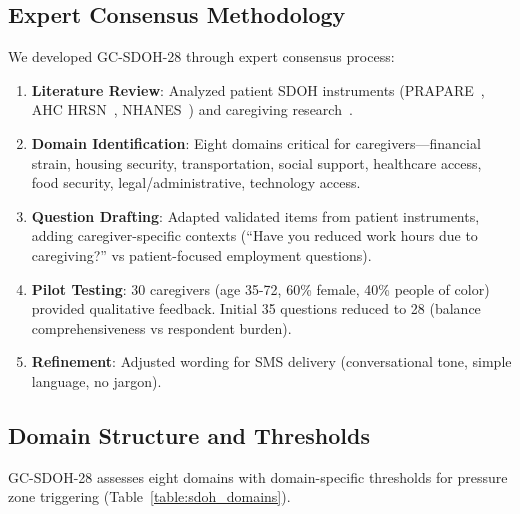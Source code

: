 \documentclass{article}
\begin{document}
\subsection{Expert Consensus Methodology}%
\label{subsec:ExpertConsensusMethodology}%
We developed GC-SDOH-28 through expert consensus process:
\begin{enumerate}
    \item \textbf{Literature Review}: Analyzed patient SDOH instruments (PRAPARE~\cite{prapare}, AHC HRSN~\cite{ahc}, NHANES~\cite{nhanes}) and caregiving research~\cite{aarp2025, bella2006, tebb1995, tebb2013}.
    \item \textbf{Domain Identification}: Eight domains critical for caregivers—financial strain, housing security, transportation, social support, healthcare access, food security, legal/administrative, technology access.
    \item \textbf{Question Drafting}: Adapted validated items from patient instruments, adding caregiver-specific contexts (``Have you reduced work hours due to caregiving?'' vs patient-focused employment questions).
    \item \textbf{Pilot Testing}: 30 caregivers (age 35-72, 60\% female, 40\% people of color) provided qualitative feedback. Initial 35 questions reduced to 28 (balance comprehensiveness vs respondent burden).
    \item \textbf{Refinement}: Adjusted wording for SMS delivery (conversational tone, simple language, no jargon).
\end{enumerate}

%
\subsection{Domain Structure and Thresholds}%
\label{subsec:DomainStructureandThresholds}%
GC-SDOH-28 assesses eight domains with domain-specific thresholds for pressure zone triggering (Table~\ref{table:sdoh_domains}).
\end{document}
